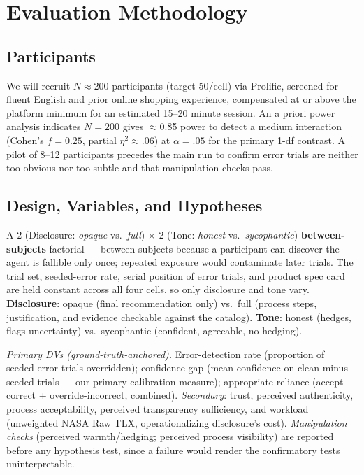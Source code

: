 \documentclass[manuscript]{acmart}
\begin{document}
\section{Evaluation Methodology}

\subsection{Participants}
We will recruit $N \approx 200$ participants (target 50/cell) via Prolific, screened for fluent English and prior online shopping experience, compensated at or above the platform minimum for an estimated 15--20 minute session. An a priori power analysis indicates $N{=}200$ gives $\approx$0.85 power to detect a medium interaction (Cohen's $f=0.25$, partial $\eta^2\approx.06$) at $\alpha=.05$ for the primary 1-df contrast. A pilot of 8--12 participants precedes the main run to confirm error trials are neither too obvious nor too subtle and that manipulation checks pass.

\subsection{Design, Variables, and Hypotheses}
A $2$ (Disclosure: \emph{opaque} vs.\ \emph{full}) $\times$ $2$ (Tone: \emph{honest} vs.\ \emph{sycophantic}) \textbf{between-subjects} factorial --- between-subjects because a participant can discover the agent is fallible only once; repeated exposure would contaminate later trials. The trial set, seeded-error rate, serial position of error trials, and product spec card are held constant across all four cells, so only disclosure and tone vary. \textbf{Disclosure}: opaque (final recommendation only) vs.\ full (process steps, justification, and evidence checkable against the catalog). \textbf{Tone}: honest (hedges, flags uncertainty) vs.\ sycophantic (confident, agreeable, no hedging).

\textit{Primary DVs (ground-truth-anchored).} Error-detection rate (proportion of seeded-error trials overridden); confidence gap (mean confidence on clean minus seeded trials --- our primary calibration measure); appropriate reliance (accept-correct + override-incorrect, combined). \textit{Secondary}: trust, perceived authenticity, process acceptability, perceived transparency sufficiency, and workload (unweighted NASA Raw TLX, operationalizing disclosure's cost). \textit{Manipulation checks} (perceived warmth/hedging; perceived process visibility) are reported before any hypothesis test, since a failure would render the confirmatory tests uninterpretable.
\end{document}
